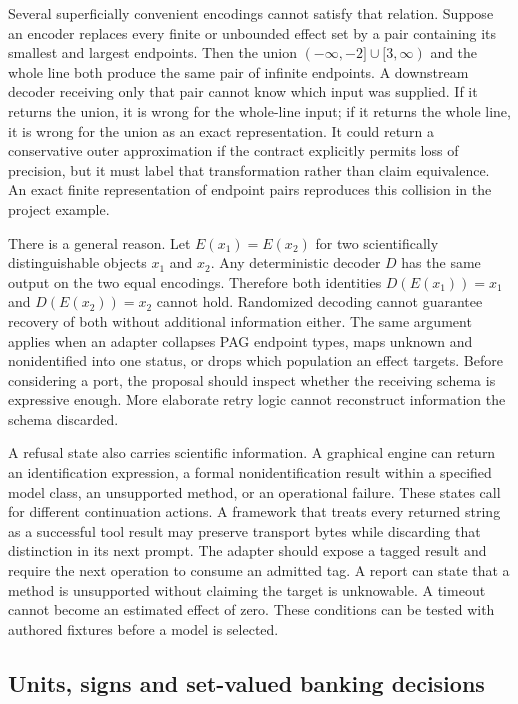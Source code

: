 Several superficially convenient encodings cannot satisfy that relation.
Suppose an encoder replaces every finite or unbounded effect set by a pair
containing its smallest and largest endpoints. Then the union
$(-\infty,-2]\cup[3,\infty)$ and the whole line both produce the same
pair of infinite endpoints. A downstream decoder receiving only that pair
cannot know which input was supplied. If it returns the union, it is wrong
for the whole-line input; if it returns the whole line, it is wrong for the
union as an exact representation. It could return a conservative outer
approximation if the contract explicitly permits loss of precision, but
it must label that transformation rather than claim equivalence. An exact
finite representation of endpoint pairs reproduces this collision in the
project example.

There is a general reason. Let $E(x_1)=E(x_2)$ for two scientifically
distinguishable objects $x_1$ and $x_2$. Any deterministic decoder $D$ has
the same output on the two equal encodings. Therefore both identities
$D(E(x_1))=x_1$ and $D(E(x_2))=x_2$ cannot hold. Randomized decoding cannot
guarantee recovery of both without additional information either. The
same argument applies when an adapter collapses PAG endpoint types, maps
unknown and nonidentified into one status, or drops which population an
effect targets. Before considering a port, the proposal should inspect
whether the receiving schema is expressive enough. More elaborate retry
logic cannot reconstruct information the schema discarded.
\citep{exec14_l6_adapter_exact}

A refusal state also carries scientific information. A graphical engine
can return an identification expression, a formal nonidentification result
within a specified model class, an unsupported method, or an operational
failure. These states call for different continuation actions. A framework
that treats every returned string as a successful tool result may preserve
transport bytes while discarding that distinction in its next prompt.
The adapter should expose a tagged result and require the next operation
to consume an admitted tag. A report can state that a method is unsupported
without claiming the target is unknowable. A timeout cannot become an
estimated effect of zero. These conditions can be tested with authored
fixtures before a model is selected.

\subsection{Units, signs and set-valued banking decisions}

